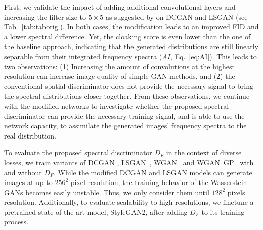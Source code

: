 \documentclass[letterpaper]{article} %
\begin{document}
First, we validate the impact of adding additional convolutional layers and increasing the filter size to $5\times5$ as suggested by \citet{margret2020upconvolution} on DCGAN and LSGAN (see Tab.~\ref{tab:taborig}).
In both cases, the modification leads to an improved FID and a lower spectral difference. Yet, the cloaking score is even lower than the one of the baseline approach, indicating that the generated distributions are still linearly separable from their integrated frequency spectra ($AI$, Eq.~\eqref{eq:AI}). This leads to two observations: (1) Increasing the amount of convolutions at the highest resolution can increase image quality of simple GAN methods, and (2) the conventional spatial discriminator does not provide the necessary signal to bring the spectral distributions closer together.
From these observations, we continue with the modified networks to investigate whether the proposed spectral discriminator can provide the necessary training signal, and is able to use the network capacity, to assimilate the generated images' frequency spectra to the real distribution.

To evaluate the proposed spectral discriminator $D_F$ in the context of diverse losses, we train variants of \mbox{DCGAN} \cite{radford2015dcgan}, LSGAN~\cite{mao2017least}, WGAN~\cite{arjovsky2017wasserstein} and WGAN~GP~\cite{gulrajani2017improved} with and without $D_F$.
 While the modified DCGAN and LSGAN models can generate images at up to $256^2$ pixel resolution, the training behavior of the Wasserstein GANs becomes easily unstable. Thus, we only consider them until $128^2$ pixels resolution.
Additionally, to evaluate scalability to high resolutions, we finetune a pretrained state-of-the-art model, StyleGAN2, after adding $D_F$ to its training process.
\end{document}
